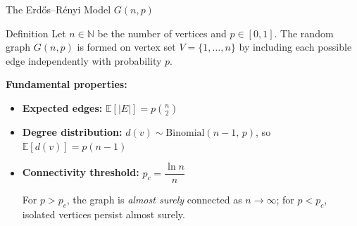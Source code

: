 \documentclass[t]{beamer}
\begin{document}
\begin{frame}{The Erd\H{o}s--R\'{e}nyi Model $G(n,p)$}

\begin{block}{Definition}
  Let $n \in \mathbb{N}$ be the number of vertices and $p \in [0,1]$.
  The random graph $G(n,p)$ is formed on vertex set $V = \{1,\ldots,n\}$
  by including each possible edge independently with probability $p$.
\end{block}

\medskip

\textbf{Fundamental properties:}
\begin{itemize}
  \item \textbf{Expected edges:}
        $\displaystyle\mathbb{E}[|E|] = p\binom{n}{2}$

  \item \textbf{Degree distribution:}
        $d(v) \sim \mathrm{Binomial}(n-1,\, p)$, so
        $\mathbb{E}[d(v)] = p(n-1)$

  \item \textbf{Connectivity threshold:}
        $p_c = \dfrac{\ln n}{n}$

        For $p > p_c$, the graph is \emph{almost surely} connected as $n \to \infty$;
        for $p < p_c$, isolated vertices persist almost surely.
\end{itemize}

\end{frame}

\end{document}
